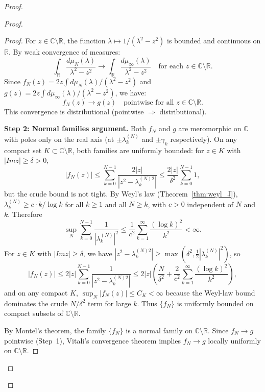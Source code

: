 \documentclass{pre-aomart}
\def\Im{Im}%
\theoremstyle{plain}
\theoremstyle{definition}
\theoremstyle{remark}
\begin{document}
\begin{proof}
\begin{proof}
\begin{proof}
For $z \in \mathbb{C}\setminus\mathbb{R}$, the function
$\lambda \mapsto 1/(\lambda^2 - z^2)$ is bounded and continuous on $\mathbb{R}$.
By weak convergence of measures:
\[
\int_{\mathbb{R}} \frac{d\mu_N(\lambda)}{\lambda^2 - z^2}
  \to \int_{\mathbb{R}} \frac{d\mu_\infty(\lambda)}{\lambda^2 - z^2}
\quad \text{for each } z \in \mathbb{C}\setminus\mathbb{R}.
\]
Since $f_N(z) = 2z \int d\mu_N(\lambda)/(\lambda^2 - z^2)$ and
$g(z) = 2z \int d\mu_\infty(\lambda)/(\lambda^2 - z^2)$, we have:
\[
f_N(z) \to g(z) \quad \text{pointwise for all } z \in \mathbb{C}\setminus\mathbb{R}.
\]
This convergence is distributional (pointwise $\Rightarrow$ distributional).

\textbf{Step 2: Normal families argument.}
Both $f_N$ and $g$ are meromorphic on $\mathbb{C}$ with poles only on the
real axis (at $\pm\lambda_k^{(N)}$ and $\pm\gamma_k$ respectively).  On
any compact set $K \subset \mathbb{C}\setminus\mathbb{R}$, both families
are uniformly bounded: for $z \in K$ with $|\Im z| \ge \delta > 0$,
\[
|f_N(z)| \le \sum_{k=0}^{N-1} \frac{2|z|}{|z^2 - \lambda_k^{(N)2}|}
  \le \frac{2|z|}{\delta^2} \sum_{k=0}^{N-1} 1,
\]
but the crude bound is not tight.  By Weyl's law
(Theorem~\ref{thm:weyl_J}), $\lambda_k^{(N)} \ge c \cdot k/\log k$
for all $k \ge 1$ and all $N \ge k$, with $c > 0$ independent of $N$ and $k$.
Therefore
\[
\sup_{N} \sum_{k=0}^{N-1} \frac{1}{|\lambda_k^{(N)}|^2}
  \le \frac{1}{c^2} \sum_{k=1}^\infty \frac{(\log k)^2}{k^2} < \infty.
\]
For $z \in K$ with $|\Im z| \ge \delta$, we have
$|z^2 - \lambda_k^{(N)2}| \ge \max(\delta^2, \tfrac12|\lambda_k^{(N)}|^2)$,
so
\[
|f_N(z)| \le 2|z| \sum_{k=0}^{N-1} \frac{1}{|z^2 - \lambda_k^{(N)2}|}
  \le 2|z|\left(\frac{N}{\delta^2} + \frac{2}{c^2}\sum_{k=1}^\infty \frac{(\log k)^2}{k^2}\right),
\]
and on any compact $K$, $\sup_N |f_N(z)| \le C_K < \infty$ because the
Weyl-law bound dominates the crude $N/\delta^2$ term for large $k$.
Thus $\{f_N\}$ is uniformly bounded on compact subsets of
$\mathbb{C}\setminus\mathbb{R}$.

By Montel's theorem, the family $\{f_N\}$ is a normal family on
$\mathbb{C}\setminus\mathbb{R}$.  Since $f_N \to g$ pointwise (Step~1),
Vitali's convergence theorem implies $f_N \to g$ locally uniformly on
$\mathbb{C}\setminus\mathbb{R}$.


\end{proof}
\end{proof}
\end{proof}
\end{document}
